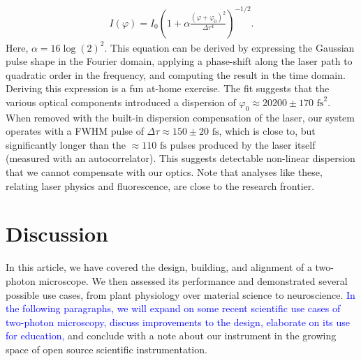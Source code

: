 \documentclass[10pt,letterpaper]{article}
\begin{document}
\begin{eqnarray}
    I(\varphi) =I_0 \left(1+\alpha\frac{(\varphi+\varphi_0)^2}{\Delta\tau^4}\right)^{-1/2}.
\end{eqnarray}
Here, $\alpha=16\log(2)^2$. This equation can be derived by expressing the Gaussian pulse shape in the Fourier domain, applying a phase-shift along the laser path to quadratic order in the frequency, and computing the result in the time domain. Deriving this expression is a fun at-home exercise. The fit suggests that the various optical components introduced a dispersion of $\varphi_0\approx20200\pm170\text{ fs}^2$. When removed with the built-in dispersion compensation of the laser, our system operates with a FWHM pulse of $\Delta\tau \approx 150\pm20\text{ fs}$, which is close to, but significantly longer than the $\approx110\text{ fs}$ pulses produced by the laser itself (measured with an autocorrelator). This suggests detectable non-linear dispersion that we cannot compensate with our optics. Note that analyses like these, relating laser physics and fluorescence, are close to the research frontier\cite{Saidi2023}.

\section*{Discussion}

In this article, we have covered the design, building, and alignment of a two-photon microscope. We then assessed its performance and demonstrated several possible use cases, from plant physiology over material science to neuroscience. \textcolor{blue}{In the following paragraphs, we will expand on some recent scientific use cases of two-photon microscopy, discuss improvements to the design, elaborate on its use for education,} and conclude with a note about our instrument in the growing space of open source scientific instrumentation.
\end{document}
